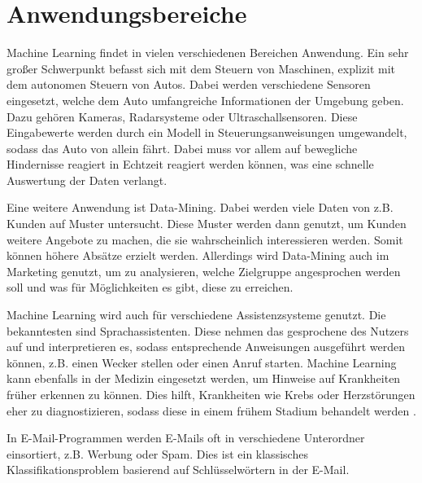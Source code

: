 \section{Anwendungsbereiche}
\label{sec:anwendungsbereiche}
Machine Learning findet in vielen verschiedenen Bereichen Anwendung. Ein sehr großer Schwerpunkt befasst sich mit dem Steuern von Maschinen, explizit mit dem autonomen Steuern von Autos. Dabei werden verschiedene Sensoren eingesetzt, welche dem Auto umfangreiche Informationen der Umgebung geben. Dazu gehören Kameras, Radarsysteme oder Ultraschallsensoren. Diese Eingabewerte werden durch ein Modell in Steuerungsanweisungen umgewandelt, sodass das Auto von allein fährt. Dabei muss vor allem auf bewegliche Hindernisse reagiert in Echtzeit reagiert werden können, was eine schnelle Auswertung der Daten verlangt.

Eine weitere Anwendung ist Data-Mining. Dabei werden viele Daten von z.B. Kunden auf Muster untersucht. Diese Muster werden dann genutzt, um Kunden weitere Angebote zu machen, die sie wahrscheinlich interessieren werden. Somit können höhere Absätze erzielt werden. Allerdings wird Data-Mining auch im Marketing genutzt, um zu analysieren, welche Zielgruppe angesprochen werden soll und was für Möglichkeiten es gibt, diese zu erreichen.

Machine Learning wird auch für verschiedene Assistenzsysteme genutzt. Die bekanntesten sind Sprachassistenten. Diese nehmen das gesprochene des Nutzers auf und interpretieren es, sodass entsprechende Anweisungen ausgeführt werden können, z.B. einen Wecker stellen oder einen Anruf starten.
Machine Learning kann ebenfalls in der Medizin eingesetzt werden, um Hinweise auf Krankheiten früher erkennen zu können. Dies hilft, Krankheiten wie Krebs oder Herzstörungen eher zu diagnostizieren, sodass diese in einem frühem Stadium behandelt werden \cite[vgl][]{AnwendungsBsp}.

In E-Mail-Programmen werden E-Mails oft in verschiedene Unterordner einsortiert, z.B. Werbung oder Spam. Dies ist ein klassisches Klassifikationsproblem basierend auf Schlüsselwörtern in der E-Mail.
